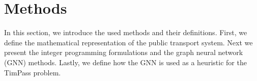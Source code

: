 \documentclass[english, 12pt, a4paper, sci, utf8, a-2b, online]{aaltothesis}
\newcommand{\draft}[1]{\textcolor{red}{\em (DRAFT) #1}}
\begin{document}





\clearpage
\section{Methods}
In this section, we introduce the used methods and their definitions. First, we define the mathematical representation of the public transport system. Next we present the integer programming formulations and the graph neural network (GNN) methods. Lastly, we define how the GNN is used as a heuristic for the TimPass problem.
\end{document}

